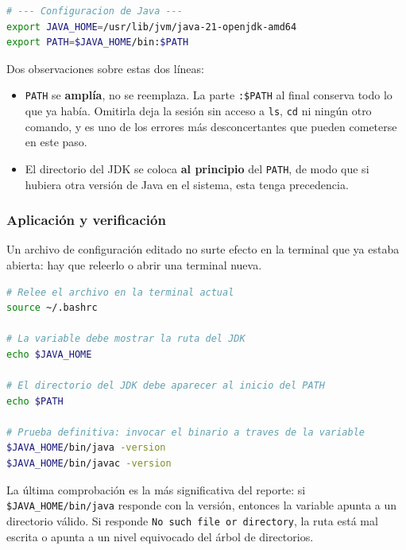 \begin{lstlisting}[language=bash,caption={Líneas añadidas a \textasciitilde/.bashrc},morekeywords={export}]
# --- Configuracion de Java ---
export JAVA_HOME=/usr/lib/jvm/java-21-openjdk-amd64
export PATH=$JAVA_HOME/bin:$PATH
\end{lstlisting}

Dos observaciones sobre estas dos líneas:

\begin{itemize}
	\item \texttt{PATH} se \textbf{amplía}, no se reemplaza. La parte \texttt{:\$PATH}
	al final conserva todo lo que ya había. Omitirla deja la sesión sin acceso a
	\texttt{ls}, \texttt{cd} ni ningún otro comando, y es uno de los errores más
	desconcertantes que pueden cometerse en este paso.
	\item El directorio del JDK se coloca \textbf{al principio} del \texttt{PATH}, de
	modo que si hubiera otra versión de Java en el sistema, esta tenga precedencia.
\end{itemize}


\subsubsection{Aplicación y verificación}

Un archivo de configuración editado no surte efecto en la terminal que ya estaba
abierta: hay que releerlo o abrir una terminal nueva.

\begin{lstlisting}[language=bash,caption={Aplicación y comprobación de las variables},morekeywords={source,echo,ls}]
# Relee el archivo en la terminal actual
source ~/.bashrc

# La variable debe mostrar la ruta del JDK
echo $JAVA_HOME

# El directorio del JDK debe aparecer al inicio del PATH
echo $PATH

# Prueba definitiva: invocar el binario a traves de la variable
$JAVA_HOME/bin/java -version
$JAVA_HOME/bin/javac -version
\end{lstlisting}

La última comprobación es la más significativa del reporte: si
\texttt{\$JAVA\_HOME/bin/java} responde con la versión, entonces la variable apunta a un
directorio válido. Si responde \texttt{No such file or directory}, la ruta está mal
escrita o apunta a un nivel equivocado del árbol de directorios.

